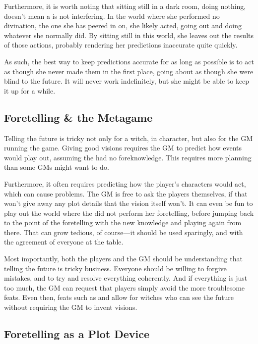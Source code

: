 Furthermore, it is worth noting that sitting still in a dark room, doing nothing, doesn't mean a  is not interfering.
In the world where she performed no divination, the one she has peered in on, she likely acted, going out and doing whatever she normally did.
By sitting still in this world, she leaves out the results of those actions, probably rendering her predictions inaccurate quite quickly.

As such, the best way to keep predictions accurate for as long as possible is to act as though she never made them in the first place, going about as though she were blind to the future.
It will never work indefinitely, but she might be able to keep it up for a while.

\subsection{Foretelling \& the Metagame}

Telling the future is tricky not only for a witch, in character, but also for the GM running the game.
Giving good visions requires the GM to predict how events would play out, assuming the  had no foreknowledge.
This requires more planning than some GMs might want to do.

Furthermore, it often requires predicting how the player's characters would act, which can cause problems.
The GM is free to ask the players themselves, if that won't give away any plot details that the vision itself won't.
It can even be fun to play out the world where the  did not perform her foretelling, before jumping back to the point of the foretelling with the  new knowledge and playing again from there.
That can grow tedious, of course---it should be used sparingly, and with the agreement of everyone at the table.

Most importantly, both the players and the GM should be understanding that telling the future is tricky business.
Everyone should be willing to forgive mistakes, and to try and resolve everything coherently.
And if everything is just too much, the GM can request that players simply avoid the more troublesome feats.
Even then, feats such as  and  allow for witches who can see the future without requiring the GM to invent visions.

\subsection{Foretelling as a Plot Device}

